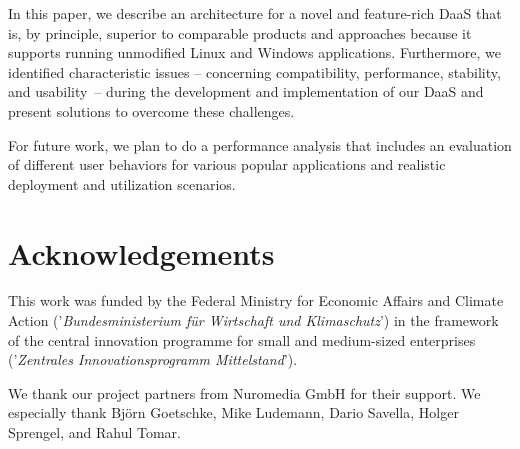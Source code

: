 \documentclass[runningheads]{llncs}
\begin{document}
In this paper, we describe an architecture for a novel and feature-rich DaaS that is, by principle, superior to comparable products and approaches because it supports running unmodified Linux and Windows applications. Furthermore, we identified characteristic issues -- concerning compatibility, performance, stability, and usability -- during the development and implementation of our DaaS and present solutions to overcome these challenges.


For future work, we plan to do a performance analysis that includes an evaluation of different user behaviors for various popular applications and realistic deployment and utilization scenarios.


\section*{Acknowledgements}

This work was funded by the Federal Ministry for Economic Affairs and Climate Action
('\textsl{Bundesministerium f\"ur Wirtschaft und Klimaschutz}')
in the framework of the central innovation programme
for small and medium-sized enterprises
('\textsl{Zentrales Innovationsprogramm Mittelstand}').

We thank our project partners from Nuromedia GmbH for their support.
We especially thank Björn Goetschke, Mike Ludemann, Dario Savella, Holger Sprengel, and Rahul Tomar.



%
%


%

\end{document}
